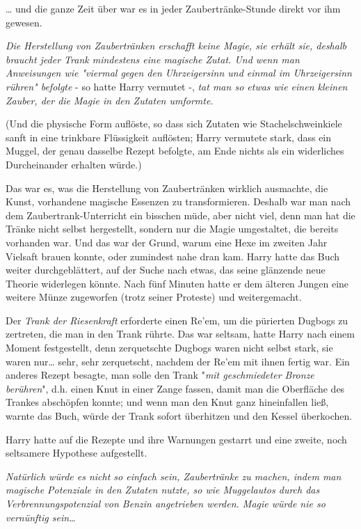 {… und die ganze Zeit über war es in jeder Zaubertränke-Stunde direkt vor ihm gewesen.

\emph{Die Herstellung von Zaubertränken erschafft keine Magie, sie erhält sie, deshalb braucht jeder Trank mindestens eine magische Zutat. Und wenn man Anweisungen wie "viermal gegen den Uhrzeigersinn und einmal im Uhrzeigersinn rühren" befolgte} - so hatte Harry vermutet -, \emph{tat man so etwas wie einen kleinen Zauber, der die Magie in den Zutaten umformte.}

(Und die physische Form auflöste, so dass sich Zutaten wie Stachelschweinkiele sanft in eine trinkbare Flüssigkeit auflösten; Harry vermutete stark, dass ein Muggel, der genau dasselbe Rezept befolgte, am Ende nichts als ein widerliches Durcheinander erhalten würde.)

Das war es, was die Herstellung von Zaubertränken wirklich ausmachte, die Kunst, vorhandene magische Essenzen zu transformieren. Deshalb war man nach dem Zaubertrank-Unterricht ein bisschen müde, aber nicht viel, denn man hat die Tränke nicht selbst hergestellt, sondern nur die Magie umgestaltet, die bereits vorhanden war. Und das war der Grund, warum eine Hexe im zweiten Jahr Vielsaft brauen konnte, oder zumindest nahe dran kam. Harry hatte das Buch weiter durchgeblättert, auf der Suche nach etwas, das seine glänzende neue Theorie widerlegen könnte. Nach fünf Minuten hatte er dem älteren Jungen eine weitere Münze zugeworfen (trotz seiner Proteste) und weitergemacht.

Der \emph{Trank der Riesenkraft} erforderte einen Re'em, um die pürierten Dugbogs zu zertreten, die man in den Trank rührte. Das war seltsam, hatte Harry nach einem Moment festgestellt, denn zerquetschte Dugbogs waren nicht selbst stark, sie waren nur… sehr, sehr zerquetscht, nachdem der Re'em mit ihnen fertig war. Ein anderes Rezept besagte, man solle den Trank "\emph{mit geschmiedeter Bronze berühren}", d.h. einen Knut in einer Zange fassen, damit man die Oberfläche des Trankes abschöpfen konnte; und wenn man den Knut ganz hineinfallen ließ, warnte das Buch, würde der Trank sofort überhitzen und den Kessel überkochen.

Harry hatte auf die Rezepte und ihre Warnungen gestarrt und eine zweite, noch seltsamere Hypothese aufgestellt.

\emph{Natürlich würde es nicht so einfach sein, Zaubertränke zu machen, indem man magische Potenziale in den Zutaten nutzte, so wie Muggelautos durch das Verbrennungspotenzial von Benzin angetrieben werden. Magie würde nie so} \emph{vernünftig sein…}

}

